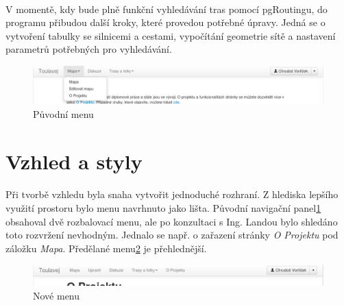 \documentclass[11pt,a4paper,titlepage,oneside]{book}
\begin{document}
			\paragraph{} V momentě, kdy bude plně funkční vyhledávání tras pomocí pgRoutingu, do programu přibudou další kroky, které provedou potřebné úpravy. Jedná se o vytvoření tabulky se silnicemi a cestami, vypočítání geometrie sítě a nastavení parametrů potřebných pro vyhledávání.

		\begin{figure}[!h]
			\begin{center}
				\includegraphics[width=12cm]{obrazky/toulavej/menu_puv.png}
				\caption{Původní menu}
				\label{fig:menu_puv}
			\end{center}
		\end{figure}	

		\section{Vzhled a styly}
			\paragraph{} Při tvorbě vzhledu byla snaha vytvořit jednoduché rozhraní. Z hlediska lepšího využití prostoru bylo menu navrhnuto jako lišta. Původní navigační panel\ref{fig:menu_puv} obsahoval dvě rozbalovací menu, ale po konzultaci s Ing. Landou bylo shledáno toto rozvržení nevhodným. Jednalo se např. o zařazení stránky \textit{O Projektu} pod záložku \textit{Mapa}. Předělané menu\ref{fig:menu_nove} je přehlednější.
		\begin{figure}[!h]
			\begin{center}
				\includegraphics[width=12cm]{obrazky/toulavej/menu_nove.png}
				\caption{Nové menu}
				\label{fig:menu_nove}
			\end{center}
		\end{figure}	
\end{document}
